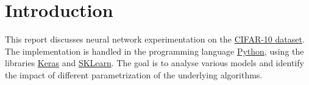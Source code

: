 \chapter{Introduction}
This report discusses neural network experimentation on the \href{https://www.cs.toronto.edu/~kriz/cifar.html}{CIFAR-10 dataset}.
The implementation is handled in the programming language \href{https://www.python.org/}{Python}, using the libraries \href{https://keras.io/}{Keras} and \href{https://scikit-learn.org/stable/}{SKLearn}.
The goal is to analyse various models and identify the impact of different parametrization of the underlying algorithms.